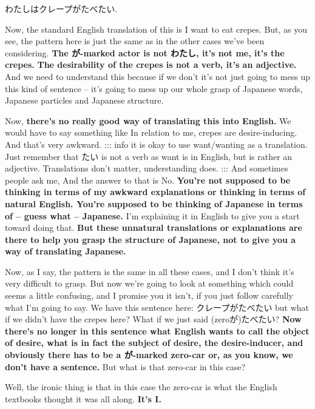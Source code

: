 わたしはクレープがたべたい.

{}

Now, the standard English translation of this is I want to eat crepes. But, as you see, the pattern here is just the same as in the other cases we've been considering. {\bf The が-marked actor is not わたし, it's not me, it's the crepes.} {\bf The desirability of the crepes is not a verb, it's an adjective.} And we need to understand this because if we don't it's not just going to mess up this kind of sentence -- it's going to mess up our whole grasp of Japanese words, Japanese particles and Japanese structure.

Now, {\bf there's no really good way of translating this into English.} We would have to say something like In relation to me, crepes are desire-inducing. And that's very awkward. ::: info it is okay to use want/wanting as a translation. Just remember that たい is not a verb as want is in English, but is rather an adjective. Translations don't matter, understanding does. ::: And sometimes people ask me,  And the answer to that is No. {\bf You're not supposed to be thinking in terms of my awkward explanations or thinking in terms of natural English. You're supposed to be thinking of Japanese in terms of -- guess what -- Japanese.} I'm explaining it in English to give you a start toward doing that. {\bf But these unnatural translations or explanations are there to help you grasp the structure of Japanese, not to give you a way of translating Japanese.}

Now, as I say, the pattern is the same in all these cases, and I don't think it's very difficult to grasp. But now we're going to look at something which could seems a little confusing, and I promise you it isn't, if you just follow carefully what I'm going to say. We have this sentence here: クレープがたべたい but what if we didn't have the crepes here? What if we just said (zeroが)たべたい? {\bf Now there's no longer in this sentence what English wants to call the object of desire, what is in fact the subject of desire, the desire-inducer, and obviously there has to be a が-marked zero-car or, as you know, we don't have a sentence.} But what is that zero-car in this case?

Well, the ironic thing is that in this case the zero-car is what the English textbooks thought it was all along. {\bf It's I.}


